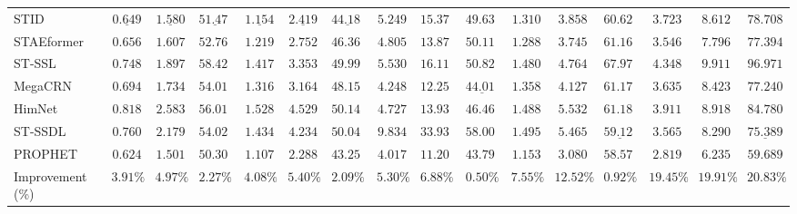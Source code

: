 \begin{table}[t]
{\begin{tabular}{l | ccc | ccc | ccc | ccc | ccc}
STID       & $\underline{0.649}$ & $\underline{1.580}$ & $\underline{51.474}$ & $\underline{1.154}$ & $\underline{2.419}$ & $\underline{44.181}$ & $5.249$ & $15.379$ & $49.638$ & $1.310$ & $3.858$ & $60.626$ & $3.723$ & $8.612$ & $78.708$ \\
STAEformer & $0.656$ & $1.607$ & $52.765$ & $1.219$ & $2.752$ & $46.368$ & $4.805$ & $13.879$ & $50.114$ & $1.288$ & $3.745$ & $61.166$ & $3.546$ & $7.796$ & $77.394$ \\
ST-SSL     & $0.748$ & $1.897$ & $58.427$ & $1.417$ & $3.353$ & $49.992$ & $5.530$ & $16.110$ & $50.822$ & $1.480$ & $4.764$ & $67.971$ & $4.348$ & $9.911$ & $96.971$ \\
MegaCRN    & $0.694$ & $1.734$ & $54.016$ & $1.316$ & $3.164$ & $48.152$ & $4.248$ & $12.254$ & $\underline{44.010}$ & $1.358$ & $4.127$ & $61.177$ & $3.635$ & $8.423$ & $77.240$ \\
HimNet     & $0.818$ & $2.583$ & $56.013$ & $1.528$ & $4.529$ & $50.145$ & $4.727$ & $13.933$ & $46.462$ & $1.488$ & $5.532$ & $61.187$ & $3.911$ & $8.918$ & $84.780$ \\
ST-SSDL    & $0.760$ & $2.179$ & $54.028$ & $1.434$ & $4.234$ & $50.042$ & $9.834$ & $33.939$ & $58.006$ & $1.495$ & $5.465$ & $\underline{59.121}$ & $3.565$ & $8.290$ & $\underline{75.389}$ \\
\midrule
PROPHET    & $\mathbf{0.624}$ & $\mathbf{1.501}$ & $\mathbf{50.304}$ & $\mathbf{1.107}$ & $\mathbf{2.288}$ & $\mathbf{43.258}$ & $\mathbf{4.017}$ & $\mathbf{11.202}$ & $\mathbf{43.790}$ & $\mathbf{1.153}$ & $\mathbf{3.080}$ & $\mathbf{58.576}$ & $\mathbf{2.819}$ & $\mathbf{6.235}$ & $\mathbf{59.689}$ \\
Improvement (\%) & $3.91\%$ & $4.97\%$ & $2.27\%$ & $4.08\%$ & $5.40\%$ & $2.09\%$ & $5.30\%$ & $6.88\%$ & $0.50\%$ & $7.55\%$ & $12.52\%$ & $0.92\%$ & $19.45\%$ & $19.91\%$ & $20.83\%$ \\
\bottomrule
\end{tabular}%
}
\endgroup
\end{table}

